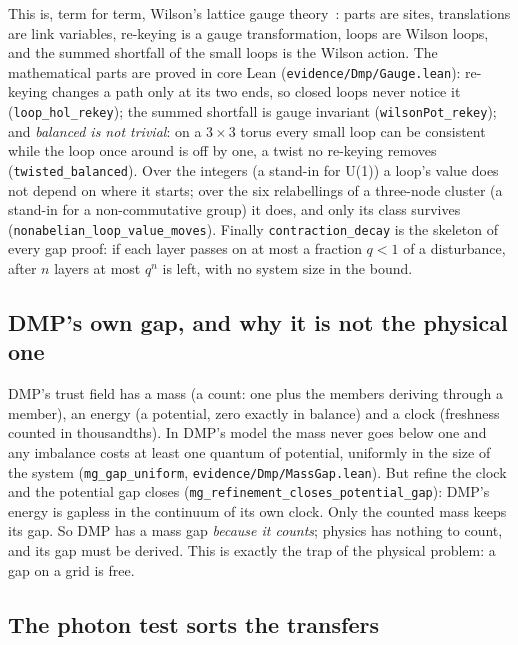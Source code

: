 \documentclass[11pt,a4paper]{article}
\newcommand{\lean}[1]{\texttt{#1}}
\begin{document}
This is, term for term, Wilson's lattice gauge theory~\cite{wilson74}: parts are sites, translations are link variables, re-keying is a
gauge transformation, loops are Wilson loops, and the summed shortfall of the small loops is the Wilson action. The mathematical parts are
proved in core Lean (\lean{evidence/Dmp/Gauge.lean}): re-keying changes a path only at its two ends, so closed loops never notice it
(\lean{loop\_hol\_rekey}); the summed shortfall is gauge invariant (\lean{wilsonPot\_rekey}); and \emph{balanced is not trivial}: on a
$3\times3$ torus every small loop can be consistent while the loop once around is off by one, a twist no re-keying removes
(\lean{twisted\_balanced}). Over the integers (a stand-in for U(1)) a loop's value does not depend on where it starts; over the six
relabellings of a three-node cluster (a stand-in for a non-commutative group) it does, and only its class survives
(\lean{nonabelian\_loop\_value\_moves}). Finally \lean{contraction\_decay} is the skeleton of every gap proof: if each layer passes on at
most a fraction $q<1$ of a disturbance, after $n$ layers at most $q^n$ is left, with no system size in the bound.

\subsection{DMP's own gap, and why it is not the physical one}

DMP's trust field has a mass (a count: one plus the members deriving through a member), an energy (a potential, zero exactly in balance)
and a clock (freshness counted in thousandths). In DMP's model the mass never goes below one and any imbalance costs at least one quantum of
potential, uniformly in the size of the system (\lean{mg\_gap\_uniform}, \lean{evidence/Dmp/MassGap.lean}). But refine the clock and the
potential gap closes (\lean{mg\_refinement\_closes\_potential\_gap}): DMP's energy is gapless in the continuum of its own clock. Only the
counted mass keeps its gap. So DMP has a mass gap \emph{because it counts}; physics has nothing to count, and its gap must be derived. This
is exactly the trap of the physical problem: a gap on a grid is free.

\subsection{The photon test sorts the transfers}
\end{document}
